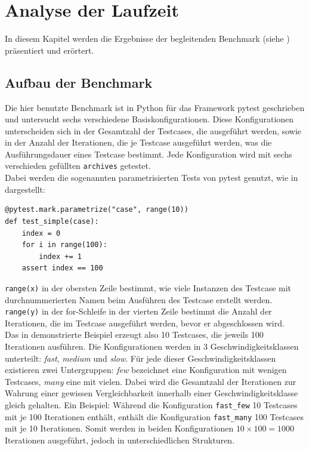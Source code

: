 \chapter{Analyse der Laufzeit}\label{chap:conclusion}
In diesem Kapitel werden die Ergebnisse der begleitenden Benchmark (siehe ) präsentiert und erörtert. 


\section{Aufbau der Benchmark}
Die hier benutzte Benchmark ist in Python für das Framework pytest geschrieben und untersucht sechs verschiedene Basiskonfigurationen. Diese Konfigurationen unterscheiden sich in der Gesamtzahl der Testcases, die ausgeführt werden, sowie in der Anzahl der Iterationen, die je Testcase ausgeführt werden, was die Ausführungsdauer eines Testcase bestimmt. Jede Konfiguration wird mit sechs verschieden gefüllten \texttt{archives} getestet.\\
Dabei werden die sogenannten parametrisierten Tests von pytest genutzt, wie in  dargestellt:
\begin{lstlisting}[caption={Inhalt von \texttt{test\_simple.py} aus der Konfiguration ''bench\_fast\_few\_00''}, label={paratestPytest}]
@pytest.mark.parametrize("case", range(10))
def test_simple(case):
    index = 0
    for i in range(100):
        index += 1
    assert index == 100
\end{lstlisting}
\texttt{range(x)} in der obersten Zeile bestimmt, wie viele Instanzen des Testcase mit durchnummerierten Namen beim Ausführen des Testcase erstellt werden.\\
\texttt{range(y)} in der for-Schleife in der vierten Zeile bestimmt die Anzahl der Iterationen, die im Testcase ausgeführt werden, bevor er abgeschlossen wird.\\
Das in  demonstrierte Beispiel erzeugt also 10 Testcases, die jeweils 100 Iterationen ausführen.
Die Konfigurationen werden in 3 Geschwindigkeitsklassen unterteilt: \textit{fast}, \textit{medium} und \textit{slow}. Für jede dieser Geschwindigkeitsklassen existieren zwei Untergruppen: \textit{few} bezeichnet eine Konfiguration mit wenigen Testcases, \textit{many} eine mit vielen. Dabei wird die Gesamtzahl der Iterationen zur Wahrung einer gewissen Vergleichbarkeit innerhalb einer Geschwindigkeitsklasse gleich gehalten. Ein Beispiel: Während die Konfiguration \texttt{fast\_few} 10 Testcases mit je 100 Iterationen enthält, enthält die Konfiguration \texttt{fast\_many} 100 Testcases mit je 10 Iterationen. Somit werden in beiden Konfigurationen $10 \times 100=1000$ Iterationen ausgeführt, jedoch in unterschiedlichen Strukturen.\\
